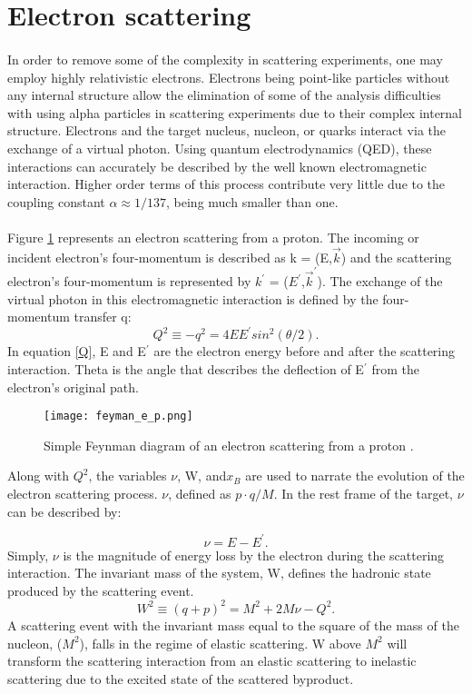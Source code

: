 \section{Electron scattering}\label{sec:escat}
\paragraph{} In order to remove some of the complexity in scattering experiments, one may employ highly relativistic electrons. Electrons being point-like particles without any internal structure allow the elimination of some of the analysis difficulties with using alpha particles in scattering experiments due to their complex internal structure. Electrons and the target nucleus, nucleon, or quarks interact via the exchange of a virtual photon. Using quantum electrodynamics (QED), these interactions can accurately be described by the well known electromagnetic interaction. Higher order terms of this process contribute very little due to the coupling constant $\alpha \approx 1/137 $, being much smaller than one. 
\paragraph{} Figure \ref{feynman} represents an electron scattering from a proton. The incoming or incident electron's four-momentum is described as k = (E,$ \vec{k}$) and the scattering electron's four-momentum is represented by $k^\prime{}$ = ($E^\prime{}$,$\vec{k}^\prime{}$). The exchange of the virtual photon in this electromagnetic interaction is defined by the four-momentum transfer q: 
\begin{equation}
\label{Q}
Q^2 \equiv -q^2 = 4EE^\prime{} sin^2(\theta/2).
\end{equation} 
In equation \ref{Q}, E and E$^\prime$ are the electron energy before and after the scattering interaction. Theta is the angle that describes the deflection of E$^\prime$ from the electron's original path. 

\begin{figure}[h]
\centering
\caption{Simple Feynman diagram of an electron scattering from a proton \cite{Flay}.}
\texttt{[image: feyman\_e\_p.png]}
\label{feynman}
\end{figure}
Along with $Q^2$, the variables $\nu$, W, and$x_B$  are used to narrate the evolution of the electron scattering process. $\nu$, defined as $p\cdot q/M$. In the rest frame of the target,  $\nu$ can be described by:

\begin{equation}
\label{v}
\nu = E - E^\prime{}.
\end{equation}
Simply, $\nu$ is the magnitude of energy loss by the electron during the scattering interaction. The invariant mass of the system, W,  defines the hadronic state produced by the scattering event. 
\begin{equation}
\label{W}
W^2 \equiv (q + p)^2 = M^2 + 2M\nu -Q^2.
\end{equation}
A scattering event with the invariant mass equal to the square of the mass of the nucleon, ($M^2$), falls in the regime of elastic scattering. W above $M^2$ will transform the scattering interaction from an elastic scattering to inelastic scattering due to the excited state of the scattered byproduct. 
